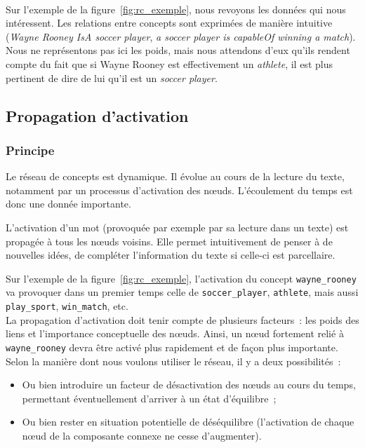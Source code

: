 \documentclass[a4paper, 12pt]{article}
\begin{document}
\paragraph{}
Sur l'exemple de la figure~\ref{fig:rc_exemple}, nous revoyons les données qui nous intéressent. Les relations entre concepts sont exprimées de manière intuitive (\textit{Wayne Rooney IsA soccer player}, \textit{a soccer player is capableOf winning a match}). Nous ne représentons pas ici les poids, mais nous attendons d'eux qu'ils rendent compte du fait que si Wayne Rooney est effectivement un \textit{athlete}, il est plus pertinent de dire de lui qu'il est un \textit{soccer player}.


\subsection{Propagation d'activation}

\subsubsection{Principe}

Le réseau de concepts est dynamique. Il évolue au cours de la lecture du texte, notamment par un processus d'activation des n\oe{}uds. L'écoulement du temps est donc une donnée importante.

L'activation d'un mot (provoquée par exemple par sa lecture dans un texte) est propagée à tous les n\oe{}uds voisins. Elle permet intuitivement de penser à de nouvelles idées, de compléter l'information du texte si celle-ci est parcellaire.

Sur l'exemple de la figure~\ref{fig:rc_exemple}, l'activation du concept \verb|wayne_rooney| va provoquer dans un premier temps celle de \verb|soccer_player|, \verb|athlete|, mais aussi \verb|play_sport|, \verb|win_match|, etc.\\

La propagation d'activation doit tenir compte de plusieurs facteurs~: les poids des liens et l'importance conceptuelle des n\oe{}uds. Ainsi, un n\oe{}ud fortement relié à \verb|wayne_rooney| devra être activé plus rapidement et de façon plus importante.\\

Selon la manière dont nous voulons utiliser le réseau, il y a deux possibilités~:
\begin{itemize}
  \item Ou bien introduire un facteur de désactivation des n\oe{}uds au cours du temps, permettant éventuellement d'arriver à un état d'équilibre~;
 \item Ou bien rester en situation potentielle de déséquilibre (l'activation de chaque n\oe{}ud de la composante connexe ne cesse d'augmenter).
\end{itemize}
\end{document}
